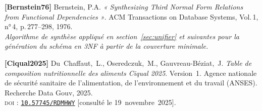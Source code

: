 \documentclass[12pt, a4paper]{article}
\begin{document}
    \bigskip
    \noindent\textbf{[Bernstein76]} \quad Bernstein, P.A. \textit{« Synthesizing Third Normal Form
    Relations from Functional Dependencies »}. ACM Transactions on Database Systems, Vol.\,1, n°\,4,
    p.\,277--298, 1976.\\
    \textit{Algorithme de synthèse appliqué en section~\ref{sec:unifier} et suivantes pour la
    génération du schéma en 3NF à partir de la couverture minimale.}

    \bigskip
    \noindent\textbf{[Ciqual2025]} \quad Du~Chaffaut,~L., Oseredczuk,~M., Gauvreau-Béziat,~J.
    \textit{Table de composition nutritionnelle des aliments Ciqual 2025}.
    Version~1. Agence nationale de sécurité sanitaire de l'alimentation, de l'environnement
    et du travail (ANSES). Recherche Data Gouv, 2025.\\
    \textsc{doi} : \href{https://doi.org/10.57745/RDMHWY}{\texttt{10.57745/RDMHWY}}
    [consulté le 19~novembre~2025].
\end{document}
